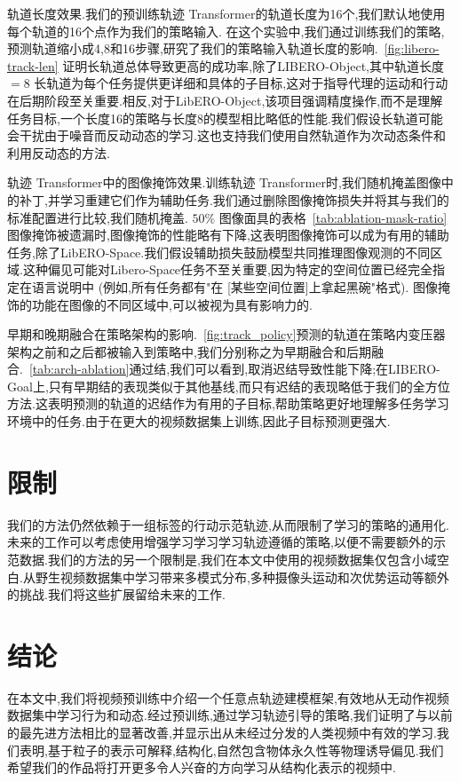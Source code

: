 \documentclass[conference]{IEEEtran}
\begin{document}
轨道长度效果.我们的预训练轨迹 Transformer的轨道长度为16个,我们默认地使用每个轨道的16个点作为我们的策略输入. 在这个实验中,我们通过训练我们的策略,预测轨道缩小成4,8和16步骤,研究了我们的策略输入轨道长度的影响.~\ref{fig:libero-track-len} 证明长轨道总体导致更高的成功率,除了LIBERO-Object,其中轨道长度 $=8$ 长轨道为每个任务提供更详细和具体的子目标,这对于指导代理的运动和行动在后期阶段至关重要.相反,对于LibERO-Object,该项目强调精度操作,而不是理解任务目标,一个长度16的策略与长度8的模型相比略低的性能.我们假设长轨道可能会干扰由于噪音而反动动态的学习.这也支持我们使用自然轨道作为次动态条件和利用反动态的方法.


轨迹 Transformer中的图像掩饰效果.训练轨迹 Transformer时,我们随机掩盖图像中的补丁,并学习重建它们作为辅助任务.我们通过删除图像掩饰损失并将其与我们的标准配置进行比较,我们随机掩盖. $50\%$ 图像面具的表格~\ref{tab:ablation-mask-ratio}图像掩饰被遗漏时,图像掩饰的性能略有下降,这表明图像掩饰可以成为有用的辅助任务,除了LibERO-Space.我们假设辅助损失鼓励模型共同推理图像观测的不同区域.这种偏见可能对Libero-Space任务不至关重要,因为特定的空间位置已经完全指定在语言说明中 (例如,所有任务都有"在 [某些空间位置]上拿起黑碗"格式). 图像掩饰的功能在图像的不同区域中,可以被视为具有影响力的. 

早期和晚期融合在策略架构的影响.~\ref{fig:track_policy}预测的轨道在策略内变压器架构之前和之后都被输入到策略中,我们分别称之为早期融合和后期融合.~\ref{tab:arch-ablation}通过结,我们可以看到,取消迟结导致性能下降;在LIBERO-Goal上,只有早期结的表现类似于其他基线,而只有迟结的表现略低于我们的全方位方法.这表明预测的轨道的迟结作为有用的子目标,帮助策略更好地理解多任务学习环境中的任务.由于在更大的视频数据集上训练,因此子目标预测更强大.
\section{限制}
我们的方法仍然依赖于一组标签的行动示范轨迹,从而限制了学习的策略的通用化.未来的工作可以考虑使用增强学习学习学习轨迹遵循的策略,以便不需要额外的示范数据.我们的方法的另一个限制是,我们在本文中使用的视频数据集仅包含小域空白.从野生视频数据集中学习带来多模式分布,多种摄像头运动和次优势运动等额外的挑战.我们将这些扩展留给未来的工作. 


\section{结论}
在本文中,我们将视频预训练中介绍一个任意点轨迹建模框架,有效地从无动作视频数据集中学习行为和动态.经过预训练,通过学习轨迹引导的策略,我们证明了与以前的最先进方法相比的显著改善,并显示出从未经过分发的人类视频中有效的学习.我们表明,基于粒子的表示可解释,结构化,自然包含物体永久性等物理诱导偏见.我们希望我们的作品将打开更多令人兴奋的方向学习从结构化表示的视频中.
\end{document}
